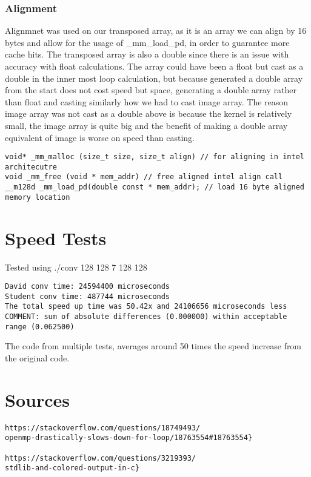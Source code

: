 \documentclass[12pt,fleqn,leqno,letterpaper]{article}
\begin{document}
\subsubsection{Alignment}
Alignmnet was used on our transposed array, as it is an array we can align by 16 bytes and allow
for the usage of \_mm\_load\_pd, in order to guarantee more cache hits. The transposed array is
also a double since there is an issue with accuracy with float calculations. The array could have
been a float but cast as a double in the inner most loop calculation, but because generated a double
array from the start does not cost speed but space, generating a double array rather than float and casting
similarly how we had to cast image array. The reason image array was not cast as a double above is because
the kernel is relatively small, the image array is quite big and the benefit of making a double array equivalent
of image is worse on speed than casting. 

\begin{verbatim}
void* _mm_malloc (size_t size, size_t align) // for aligning in intel architecutre
void _mm_free (void * mem_addr) // free aligned intel align call
__m128d _mm_load_pd(double const * mem_addr); // load 16 byte aligned memory location
\end{verbatim}

\section{Speed Tests}
Tested using ./conv 128 128 7 128 128 
\begin{verbatim}
David conv time: 24594400 microseconds
Student conv time: 487744 microseconds
The total speed up time was 50.42x and 24106656 microseconds less
COMMENT: sum of absolute differences (0.000000) within acceptable range (0.062500)
\end{verbatim}
The code from multiple tests, averages around 50 times the speed increase from the original
code.

\section{Sources}
\begin{verbatim}
https://stackoverflow.com/questions/18749493/
openmp-drastically-slows-down-for-loop/18763554#18763554}

https://stackoverflow.com/questions/3219393/
stdlib-and-colored-output-in-c}
\end{verbatim}
%
\end{document}
